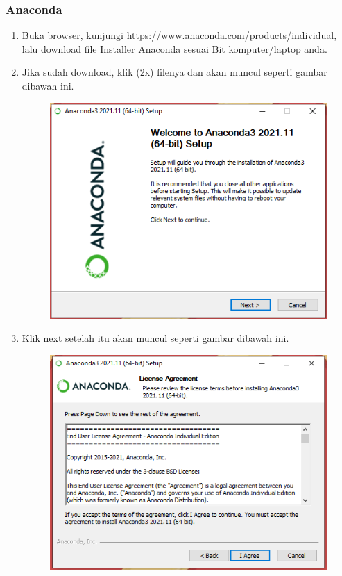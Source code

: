 \subsubsection{Anaconda}
\begin{enumerate}
\item Buka browser, kunjungi \url{https://www.anaconda.com/products/individual}, lalu download file Installer Anaconda sesuai Bit komputer/laptop anda.
\item Jika sudah download, klik (2x) filenya dan akan muncul seperti gambar dibawah ini.
\begin{figure}[H]
        \centerline{\includegraphics[scale=0.75]{figures/instalasi-anaconda-windows/step1}}
        \label{instalanacondawindowsstep1}
\end{figure}
\item Klik next setelah itu akan muncul seperti gambar dibawah ini.
\begin{figure}[H]
        \centerline{\includegraphics[scale=0.75]{figures/instalasi-anaconda-windows/step2}}

\end{figure}
\end{enumerate}
